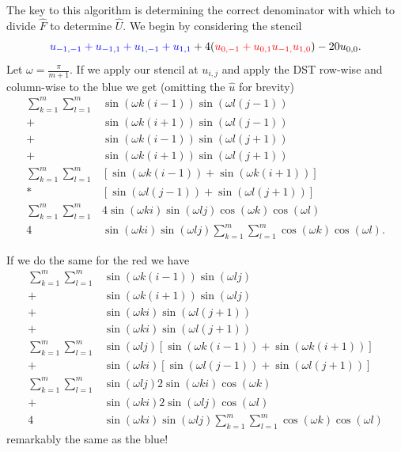 \documentclass[12pt]{article}
\begin{document}
The key to this algorithm is determining the correct denominator with which to divide $\hat{F}$ to determine $\hat{U}$. We begin by considering the stencil
$$
{\color{blue}u_{-1,-1}+u_{-1,1}+u_{1,-1}+u_{1,1}}+ 4({\color{red}u_{0,-1}+u_{0,1}u_{-1,}u_{1,0}}) - 20 u_{0,0}.
$$
Let $\omega = \frac{\pi}{m+1}$. If we apply our stencil at $u_{i,j}$ and apply the DST row-wise and column-wise to the {\color{blue}blue} we get (omitting the $\hat{u}$ for brevity)
\begin{align*}
\sum_{k=1}^m\sum_{l=1}^m & \sin(\omega k(i-1))\sin(\omega l(j-1)) \\
					   + & \sin(\omega k(i+1))\sin(\omega l(j-1)) \\
					   + & \sin(\omega k(i-1))\sin(\omega l(j+1)) \\
					   + & \sin(\omega k(i+1))\sin(\omega l(j+1)) \\
\sum_{k=1}^m\sum_{l=1}^m & \left[ \sin(\omega k(i-1)) + \sin(\omega k(i+1)) \right]\\
					   * & \left[ \sin(\omega l(j-1)) + \sin(\omega l(j+1)) \right]\\
\sum_{k=1}^m\sum_{l=1}^m & 4\sin(\omega ki)\sin(\omega lj)\cos(\omega k)\cos(\omega l) \\
4 & \sin(\omega ki)\sin(\omega lj)\sum_{k=1}^m\sum_{l=1}^m \cos(\omega k)\cos(\omega l).
\end{align*}

If we do the same for the {\color{red}red} we have
\begin{align*}
\sum_{k=1}^m\sum_{l=1}^m & \sin(\omega k(i-1))\sin(\omega lj) \\
					   + & \sin(\omega k(i+1))\sin(\omega lj) \\
					   + & \sin(\omega ki)\sin(\omega l(j+1)) \\
					   + & \sin(\omega ki)\sin(\omega l(j+1)) \\
\sum_{k=1}^m\sum_{l=1}^m & \sin(\omega lj) \left[ \sin(\omega k(i-1)) + \sin(\omega k(i+1)) \right]\\
					   + & \sin(\omega ki) \left[ \sin(\omega l(j-1)) + \sin(\omega l(j+1)) \right] \\
\sum_{k=1}^m\sum_{l=1}^m & \sin(\omega lj) 2\sin(\omega ki) \cos(\omega k) \\
                       + & \sin(\omega ki) 2\sin(\omega lj) \cos(\omega l) \\
4 & \sin(\omega ki)\sin(\omega lj)\sum_{k=1}^m\sum_{l=1}^m \cos(\omega k)\cos(\omega l)       
\end{align*}
remarkably the same as the {\color{blue}blue}! \bigbreak
\end{document}

